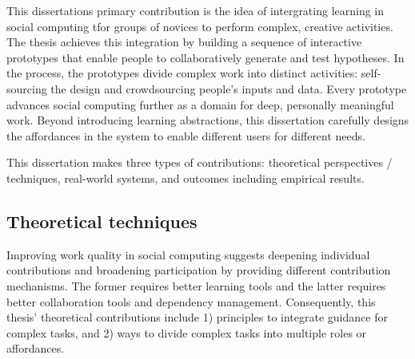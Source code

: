 This dissertation\textquotesingle s primary contribution is the idea of intergrating learning in social computing tfor groups of novices to perform complex, creative activities. The thesis achieves this integration by building a sequence of interactive prototypes that enable people to collaboratively generate and test hypotheses. In the process, the prototypes divide complex work into distinct activities: self-sourcing the design and crowdsourcing people's inputs and data. Every prototype advances social computing further as a domain for deep, personally meaningful work. Beyond introducing learning abstractions, this dissertation carefully designs the affordances in the system to enable different users for different needs. 

This dissertation makes three types of contributions: theoretical perspectives / techniques, real-world systems, and outcomes including empirical results.

\subsection{Theoretical techniques}
Improving  work quality in social computing suggests deepening individual contributions and broadening participation by providing different contribution mechanisms. The former requires better learning tools and the latter requires better collaboration tools and dependency management. Consequently, this thesis' theoretical contributions include 1) principles to integrate guidance for complex tasks, and 2) ways to divide complex tasks into multiple roles or affordances.


